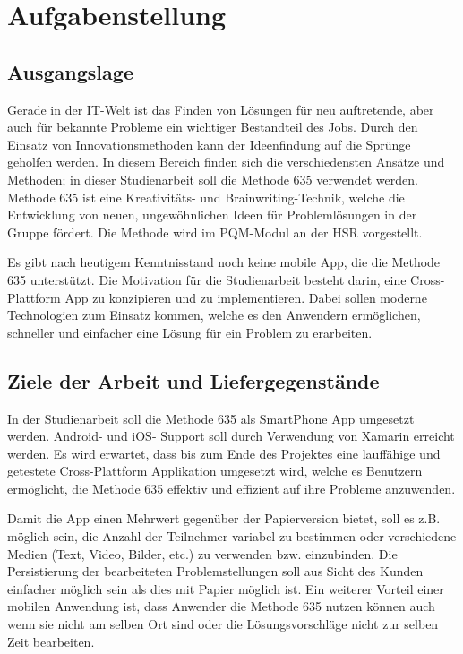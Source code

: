 \section{Aufgabenstellung}
\label{Aufgabenstellung}

\subsection{Ausgangslage}
Gerade in der IT-Welt ist das Finden von Lösungen für neu auftretende, aber auch für bekannte Probleme ein wichtiger Bestandteil des Jobs. Durch den Einsatz von Innovationsmethoden kann der Ideenfindung auf die Sprünge geholfen werden. In diesem Bereich finden sich die verschiedensten Ansätze und Methoden; in dieser Studienarbeit soll die Methode 635 \cite{methode-635} verwendet werden. Methode 635 ist eine Kreativitäts- und Brainwriting-Technik, welche die Entwicklung von neuen, ungewöhnlichen Ideen für Problemlösungen in der Gruppe fördert. Die Methode wird im PQM-Modul an der HSR vorgestellt.
 
Es gibt nach heutigem Kenntnisstand noch keine mobile App, die die Methode 635 unterstützt. Die Motivation für die Studienarbeit besteht darin, eine Cross-Plattform App zu konzipieren und zu implementieren. Dabei sollen moderne Technologien zum Einsatz kommen, welche es den Anwendern ermöglichen, schneller und einfacher eine Lösung für ein Problem zu erarbeiten.

\subsection{Ziele der Arbeit und Liefergegenstände}\label{subsec:ziele}
In der Studienarbeit soll die Methode 635 als SmartPhone App umgesetzt werden. Android- und iOS- Support soll durch Verwendung von Xamarin erreicht werden.
Es wird erwartet, dass bis zum Ende des Projektes eine lauffähige und getestete Cross-Plattform Applikation umgesetzt wird, welche es Benutzern ermöglicht, die Methode 635 effektiv und effizient auf ihre Probleme anzuwenden. 

Damit die App einen Mehrwert gegenüber der Papierversion bietet, soll es z.B. möglich sein, die Anzahl der Teilnehmer variabel zu bestimmen oder verschiedene Medien (Text, Video, Bilder, etc.) zu verwenden bzw. einzubinden. Die Persistierung der bearbeiteten Problemstellungen soll aus Sicht des Kunden einfacher möglich sein als dies mit Papier möglich ist. Ein weiterer Vorteil einer mobilen Anwendung ist, dass Anwender die Methode 635 nutzen können auch wenn sie nicht am selben Ort sind oder die Lösungsvorschläge nicht zur selben Zeit bearbeiten. 

